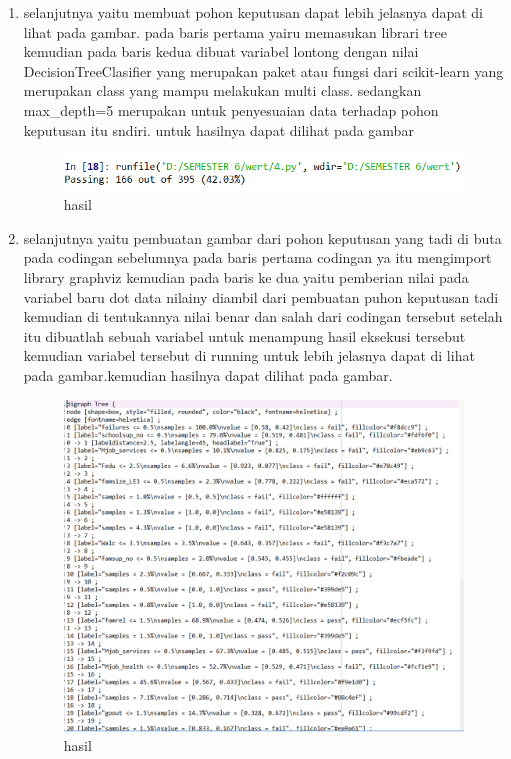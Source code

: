 \begin{enumerate}
\item selanjutnya yaitu membuat pohon keputusan dapat lebih jelasnya dapat di lihat pada gambar. pada baris pertama yairu memasukan librari tree kemudian pada baris kedua dibuat variabel lontong dengan nilai DecisionTreeClasifier yang merupakan paket atau fungsi dari scikit-learn yang merupakan class yang mampu melakukan multi class. sedangkan max\_depth=5 merupakan untuk penyesuaian data terhadap pohon keputusan itu sndiri. untuk hasilnya dapat dilihat pada gambar

\begin{figure}[ht]
\centering
\includegraphics[scale=0.5]{figures/1174050/chapter2/14.PNG}
\caption{hasil}
\label{contoh}
\end{figure}

\item selanjutnya yaitu pembuatan gambar dari pohon keputusan yang tadi di buta pada codingan sebelumnya pada baris pertama codingan ya itu mengimport library graphviz kemudian pada baris ke dua yaitu pemberian nilai pada variabel baru dot data nilainy diambil dari pembuatan puhon keputusan tadi kemudian di tentukannya nilai benar dan salah dari codingan tersebut setelah itu dibuatlah sebuah variabel untuk menampung hasil eksekusi tersebut kemudian variabel tersebut di running untuk lebih jelasnya dapat di lihat pada gambar.kemudian hasilnya dapat dilihat pada gambar.

\begin{figure}[ht]
\centering
\includegraphics[scale=0.5]{figures/1174050/chapter2/15.PNG}
\caption{hasil}
\label{contoh}
\end{figure}


\end{enumerate}
